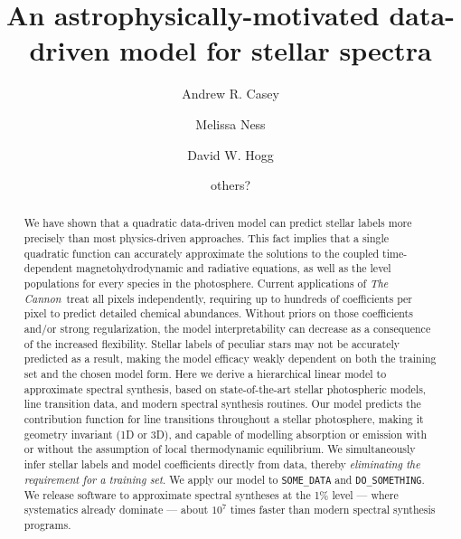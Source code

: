 \documentclass{aastex61}
\newcommand{\project}[1]{\textsl{#1}}
\newcommand{\tc}{\project{The Cannon}}
\newcommand{\thecannon}{\tc}
\begin{document}
\title{An astrophysically-motivated data-driven model for stellar spectra}



\author[0000-0003-0174-0564]{Andrew R. Casey}


\author{Melissa Ness}


\author{David W. Hogg}



\author{others?}
 


\begin{abstract}
We have shown that a quadratic data-driven model can predict stellar labels
more precisely than most physics-driven approaches.  This fact implies that 
a single quadratic function can accurately approximate the solutions to the 
coupled time-dependent magnetohydrodynamic and radiative equations, as well
as the level populations for every species in the photosphere.  Current 
applications of \thecannon\ treat all pixels independently, requiring up to
hundreds of coefficients per pixel to predict detailed chemical abundances.
Without priors on those coefficients and/or strong regularization, the model
interpretability can decrease as a consequence of the increased flexibility.
Stellar labels of peculiar stars may not be accurately predicted as a result,
making the model efficacy weakly dependent on both the training set and the 
chosen model form.  Here we derive a hierarchical linear model to approximate
spectral synthesis, based on state-of-the-art stellar photospheric models, 
line transition data, and modern spectral synthesis routines.  Our model 
predicts the contribution function for line transitions throughout a stellar 
photosphere, making it geometry invariant (1D or 3D), and capable of modelling
absorption or emission with or without the assumption of local thermodynamic
equilibrium.  We simultaneously infer stellar labels and model coefficients 
directly from data, thereby \emph{eliminating the requirement for a training 
set}.
We apply our model to \texttt{SOME\_DATA} and
\texttt{DO\_SOMETHING}.
We release software to approximate spectral syntheses at the 1\% level --- 
where systematics already dominate --- about $10^7$ times faster than modern
spectral synthesis programs.
\end{abstract}
\end{document}
